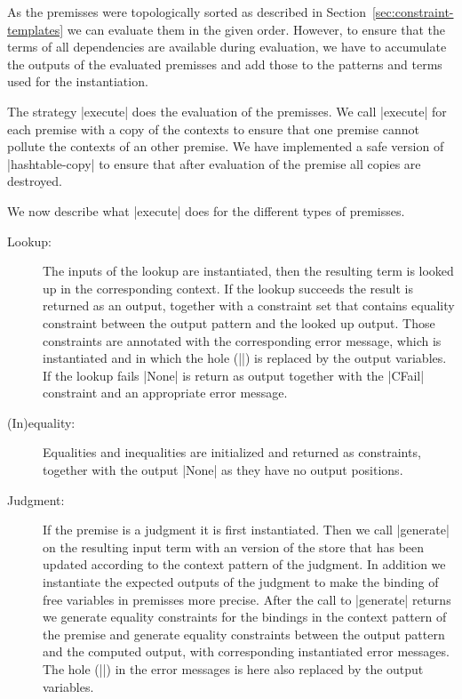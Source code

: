 As the premisses were topologically sorted as described in
Section~\ref{sec:constraint-templates} we can evaluate them in the
given order. However, to ensure that the terms of all dependencies are
available during evaluation, we have to accumulate the outputs of the
evaluated premisses and add those to the patterns and terms used for
the instantiation.

The strategy \code|execute| does the evaluation of the premisses. We
call \code|execute| for each premise with a copy of the contexts to
ensure that one premise cannot pollute the contexts of an other
premise. We have implemented a safe version of \code|hashtable-copy|
to ensure that after evaluation of the premise all copies are
destroyed.

We now describe what \code|execute| does for the different types of
premisses.

\begin{description}
\item[Lookup:] The inputs of the lookup are instantiated, then the
  resulting term is looked up in the corresponding context. If the
  lookup succeeds the result is returned as an output, together with a
  constraint set that contains equality constraint between the output
  pattern and the looked up output. Those constraints are annotated
  with the corresponding error message, which is instantiated and in
  which the hole (\code|{}|) is replaced by the output variables. If
  the lookup fails \code|None| is return as output together with the
  \code|CFail| constraint and an appropriate error message.
\item[(In)equality:] Equalities and inequalities are initialized and
  returned as constraints, together with the output \code|None| as
  they have no output positions.
\item[Judgment:] If the premise is a judgment it is first
  instantiated. Then we call \code|generate| on the resulting input
  term with an version of the store that has been updated according to
  the context pattern of the judgment. In addition we instantiate the
  expected outputs of the judgment to make the binding of free
  variables in premisses more precise. After the call to
  \code|generate| returns we generate equality constraints for the
  bindings in the context pattern of the premise and generate equality
  constraints between the output pattern and the computed output, with
  corresponding instantiated error messages. The hole (\code|{}|) in
  the error messages is here also replaced by the output variables.
\end{description}


